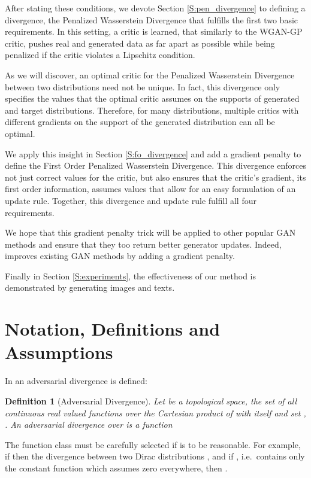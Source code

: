 \documentclass{article}
\newtheorem{definition}{Definition}
\begin{document}
 After stating these conditions, we devote Section \ref{S:pen_divergence} to defining
 a divergence, the Penalized Wasserstein Divergence that fulfills the first
 two basic requirements. In this setting, a critic is learned, that similarly to the WGAN-GP critic, pushes real and generated
 data as far apart as possible while being penalized if the critic violates a Lipschitz condition.

 As we will discover, an optimal critic for the Penalized Wasserstein Divergence between two distributions need not be unique.
 In fact, this divergence only specifies the values that the optimal critic assumes on the supports of generated and target distributions.
 Therefore, for many distributions, multiple critics with different gradients on the support of the generated distribution can all be optimal.

 We apply this insight in Section \ref{S:fo_divergence} and add a gradient penalty to define the
 First Order Penalized Wasserstein Divergence. This divergence enforces not just correct values for the critic, but also
 ensures that the critic's gradient, its first order information, assumes values that allow for an easy formulation of an update rule.
 Together, this divergence and update rule fulfill all four requirements.

 We hope that this gradient penalty trick will be applied to other popular GAN methods and ensure that they too return better generator updates.
 Indeed, \cite{fedus2017many} improves existing GAN methods by adding a gradient penalty.

 Finally in Section \ref{S:experiments}, the effectiveness of our method is demonstrated by generating
 images and texts.

 \section{Notation, Definitions and Assumptions}\label{S:notation}

 In \cite{liu2017approximation} an adversarial divergence is defined:
\begin{definition}[Adversarial Divergence]\label{D:adversarial_divergence_old}
 Let  be a topological space,  the set of all continuous real valued functions over the Cartesian product 
 of  with itself and set , . An adversarial divergence  over  is a function
 
\end{definition}

The function class  must be carefully selected if  is to be reasonable.
For example, if  then the divergence between two Dirac distributions , and if , i.e.\ 
contains only the constant function which assumes zero everywhere, then .
\end{document}
